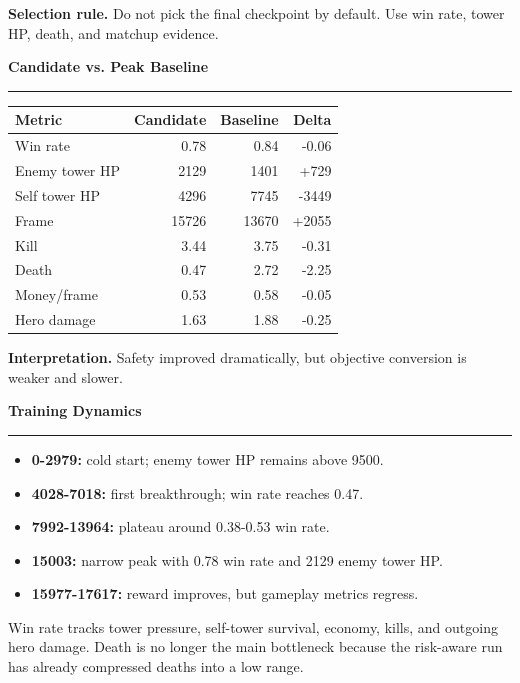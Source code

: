 \documentclass[final]{article}
\newcommand{\BlockTitle}[1]{%
  {\fontsize{36}{42}\selectfont\bfseries\color{ink}#1}\par
  \vspace{0.26cm}
  {\color{rule}\rule{\linewidth}{1.9pt}}\par
  \vspace{0.62cm}
}
\newcommand{\PosterBlock}[2]{%
  \begin{minipage}[t]{\linewidth}
    \BlockTitle{#1}
    {\fontsize{25.5}{32}\selectfont\color{ink}\RaggedRight #2}
  \end{minipage}
}
\begin{document}
\begin{minipage}[t]{70.4cm}
\begin{minipage}[t]{22.4cm}
{\vspace{0.72cm}
\textbf{Selection rule.} Do not pick the final checkpoint by default. Use win rate, tower HP, death, and matchup evidence.
}

\vspace{2.05cm}

\PosterBlock{Candidate vs. Peak Baseline}{
\begin{tabularx}{\linewidth}{>{\raggedright\arraybackslash}X r r r}
\toprule
\textbf{Metric} & \textbf{Candidate} & \textbf{Baseline} & \textbf{Delta}\\
\midrule
Win rate & 0.78 & 0.84 & -0.06\\
Enemy tower HP & 2129 & 1401 & +729\\
Self tower HP & 4296 & 7745 & -3449\\
Frame & 15726 & 13670 & +2055\\
Kill & 3.44 & 3.75 & -0.31\\
Death & 0.47 & 2.72 & -2.25\\
Money/frame & 0.53 & 0.58 & -0.05\\
Hero damage & 1.63 & 1.88 & -0.25\\
\bottomrule
\end{tabularx}

\vspace{0.72cm}
\textbf{Interpretation.} Safety improved dramatically, but objective conversion is weaker and slower.
}
\end{minipage}
\hfill
\begin{minipage}[t]{21.8cm}
\PosterBlock{Training Dynamics}{
\begin{itemize}
  \item \textbf{0-2979:} cold start; enemy tower HP remains above 9500.
  \item \textbf{4028-7018:} first breakthrough; win rate reaches 0.47.
  \item \textbf{7992-13964:} plateau around 0.38-0.53 win rate.
  \item \textbf{15003:} narrow peak with 0.78 win rate and 2129 enemy tower HP.
  \item \textbf{15977-17617:} reward improves, but gameplay metrics regress.
\end{itemize}

\vspace{0.72cm}
Win rate tracks tower pressure, self-tower survival, economy, kills, and outgoing hero damage. Death is no longer the main bottleneck because the risk-aware run has already compressed deaths into a low range.
}


\end{minipage}
\end{minipage}
\end{document}
